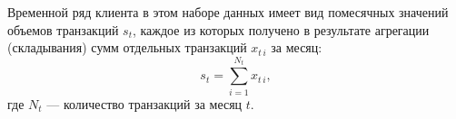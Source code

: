 Временной ряд клиента в этом наборе данных имеет вид помесячных значений объемов транзакций $s_t$, каждое из которых получено в результате агрегации (складывания) сумм отдельных транзакций $x_{t\,i}$ за месяц:
\begin{equation*}
	s_t = \sum_{i=1}^{N_t} x_{t\,i},
\end{equation*}
где $N_t$ --- количество транзакций за месяц $t$.

%
%
%
